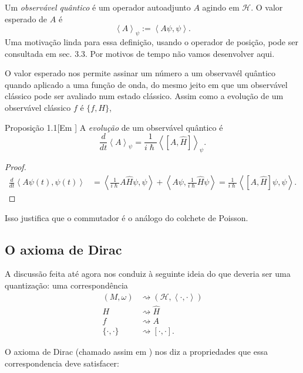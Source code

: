 Um \textit{observável quântico} é um operador autoadjunto $A$ agindo em $\mathcal{H}$. O valor esperado de $A$ é
\[\left<A\right>_\psi:=\left<A\psi,\psi\right>.\]
Uma motivação linda para essa definição, usando o operador de posição, pode ser consultada em \cite{hallq} sec. 3.3. Por motivos de tempo não vamos desenvolver aqui.

O valor esperado nos permite assinar um número a um observavél quântico quando aplicado a uma função de onda, do mesmo jeito em que um observável clássico pode ser avaliado num estado clássico. Assim como a evolução de um observável clássico $f$ é $\{f,H\}$,
\begin{thing3}{Proposição 1.1}[Em \cite{wang}]\leavevmode
	A \textit{evolução} de um observável quântico é
\[\frac{d}{dt}\left<A\right>_{\psi}=\frac{1}{i\hslash}\left<[A,\hat{H}]\right>_\psi.\]
\end{thing3}
\begin{proof}\leavevmode
\begin{align*}
	\frac{d}{dt}\left<A\psi(t),\psi(t)\right>&=\left<\frac{1}{i\hslash}A\hat{H}\psi,\psi\right>+\left<A\psi,\frac{1}{i\hslash}\hat{H}\psi\right>=\frac{1}{i\hslash}\left<[A,\hat{H}]\psi,\psi\right>.
\end{align*}
\end{proof}
Isso justifica que o commutador é o análogo do colchete de Poisson.

\subsection{O axioma de Dirac}

A discussão feita até agora nos conduiz à seguinte ideia do que deveria ser uma quantização: uma correspondência
\begin{align*}
	(M,\omega)&\rightsquigarrow (\mathcal{H},\left<\cdot,\cdot\right>)\\
	H&\rightsquigarrow \hat{H}\\
	f&\rightsquigarrow A\\
	\{\cdot,\cdot\}&\rightsquigarrow [\cdot,\cdot].
\end{align*}

O axioma de Dirac (chamado assim em \cite{wang}) nos diz a propriedades que essa correspondencia deve satisfacer:

